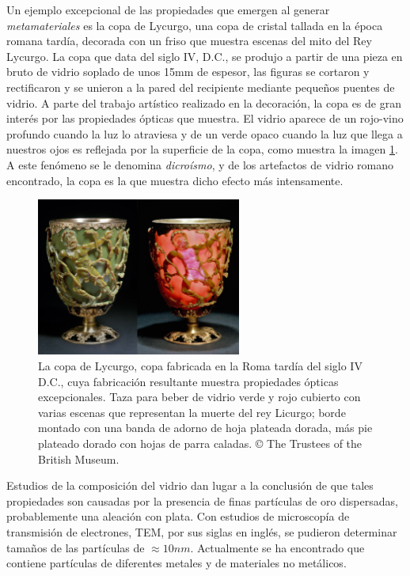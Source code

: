 \documentclass[12pt]{article}
\begin{document}
Un ejemplo excepcional de las propiedades que emergen al generar
\textit{metamateriales} es la copa de Lycurgo, una copa de cristal
tallada en la época romana tardía, decorada con un friso que muestra
escenas del mito del Rey Lycurgo. La copa que data del siglo IV, D.C.,
se produjo a partir de una pieza en bruto de vidrio soplado de unos
15mm de espesor, las figuras se cortaron y rectificaron y se unieron a
la pared del recipiente mediante pequeños puentes de vidrio. A parte
del trabajo artístico realizado en la decoración, la copa es de gran
interés por las propiedades ópticas que muestra. El vidrio aparece de
un rojo-vino profundo cuando la luz lo atraviesa y de un verde opaco
cuando la luz que llega a nuestros ojos es reflejada por la superficie
de la copa, como muestra la imagen \ref{Lycurgus}. A este fenómeno se
le denomina \textit{dicroísmo}, y de los artefactos de vidrio romano
encontrado, la copa es la que muestra dicho efecto más
intensamente. \cite{LycurgusInvestigation}
\begin{figure}
    \centering
    \includegraphics[width = 0.6\textwidth]{Lycurguscup.jpg}
    \caption{La copa de Lycurgo, copa fabricada en la Roma tardía del
      siglo IV D.C., cuya fabricación resultante muestra propiedades
      ópticas excepcionales.  Taza para beber de vidrio verde y rojo
      cubierto con varias escenas que representan la muerte del rey
      Licurgo; borde montado con una banda de adorno de hoja plateada
      dorada, más pie plateado dorado con hojas de parra caladas. ©
      The Trustees of the British Museum.}
    \label{Lycurgus}
\end{figure}
Estudios de la composición del vidrio dan lugar a la conclusión de que
tales propiedades son causadas por la presencia de finas partículas de
oro dispersadas, probablemente una aleación con plata. Con estudios de
microscopía de transmisión de electrones, TEM, por sus siglas en
inglés, se pudieron determinar tamaños de las partículas de $\approx
10 nm $. Actualmente se ha encontrado que contiene partículas de
diferentes metales y de materiales no metálicos.
\end{document}
